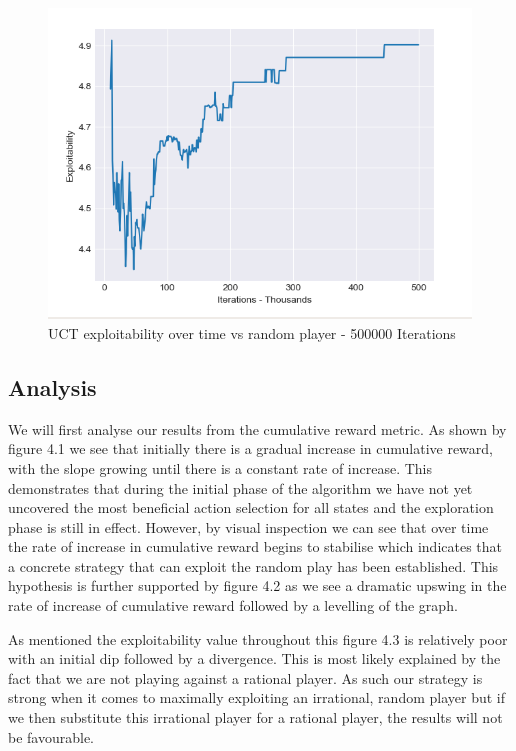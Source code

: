\begin{figure}[ht]
    \includegraphics[scale=.7]{images/exploitability_500000_20_random.png}
    \caption{UCT exploitability over time vs random player - 500000 Iterations}
\end{figure}

\subsection{Analysis}\label{subsec:analysis1}
We will first analyse our results from the cumulative reward metric.
As shown by figure 4.1 we see that initially there is a gradual increase in cumulative reward,
with the slope growing until there is a constant rate of increase.
This demonstrates that during the initial phase of the algorithm we have not yet uncovered
the most beneficial action selection for all states and the exploration phase is still in effect.
However, by visual inspection we can see that over time the rate of increase in cumulative
reward begins to stabilise which indicates that a concrete strategy that can exploit
the random play has been established.
This hypothesis is further supported by figure 4.2 as we see a dramatic upswing
in the rate of increase of cumulative reward followed by a levelling of the graph.

As mentioned the exploitability value throughout this figure 4.3 is relatively poor with an initial dip followed
by a divergence.
This is most likely explained by the fact that we are not playing against a rational player.
As such our strategy is strong when it comes to maximally exploiting an irrational, random player
but if we then substitute this irrational player for a rational player, the results will not be favourable.


